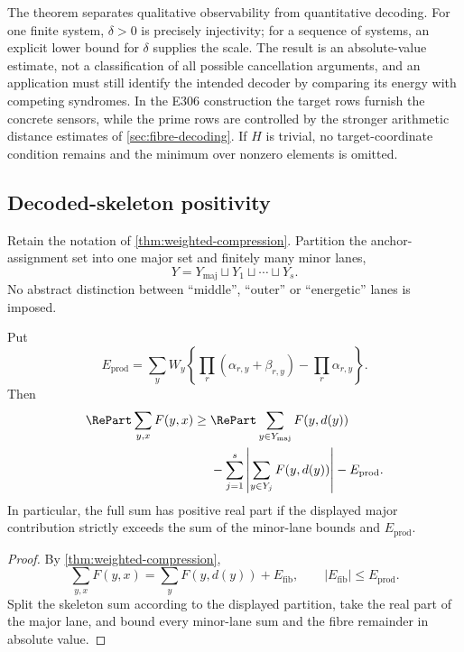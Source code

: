 The theorem separates qualitative observability from quantitative decoding.  For one finite system, $\delta>0$ is precisely injectivity; for a sequence of systems, an explicit lower bound for $\delta$ supplies the scale.  The result is an absolute-value estimate, not a classification of all possible cancellation arguments, and an application must still identify the intended decoder by comparing its energy with competing syndromes.  In the E306 construction the target rows furnish the concrete sensors, while the prime rows are controlled by the stronger arithmetic distance estimates of \cref{sec:fibre-decoding}.  If $H$ is trivial, no target-coordinate condition remains and the minimum over nonzero elements is omitted.

\subsection{Decoded-skeleton positivity}

Retain the notation of \cref{thm:weighted-compression}.  Partition the anchor-assignment set into one major set and finitely many minor lanes,
\[
 Y=Y_{\mathrm{maj}}\sqcup Y_1\sqcup\cdots\sqcup Y_s.
\]
No abstract distinction between ``middle'', ``outer'' or ``energetic'' lanes is imposed.

\begin{proposition}
\label{prop:decoded-skeleton-positivity}
Put
\[
 E_{\mathrm{prod}}=
 \sum_yW_y\left\{
   \prod_r(\alpha_{r,y}+\beta_{r,y})
   -\prod_r\alpha_{r,y}
 \right\}.
\]
Then
\begin{align*}
 \RePart\sum_{y,x}F(y,x)
 \geq{}&
 \RePart\sum_{y\in Y_{\mathrm{maj}}}F(y,d(y))\\
 &-\sum_{j=1}^s\left|\sum_{y\in Y_j}F(y,d(y))\right|
 -E_{\mathrm{prod}}.
\end{align*}
In particular, the full sum has positive real part if the displayed major contribution strictly exceeds the sum of the minor-lane bounds and $E_{\mathrm{prod}}$.
\end{proposition}

\begin{proof}
By \cref{thm:weighted-compression},
\[
 \sum_{y,x}F(y,x)=\sum_yF(y,d(y))+E_{\mathrm{fib}},
 \qquad
 |E_{\mathrm{fib}}|\leq E_{\mathrm{prod}}.
\]
Split the skeleton sum according to the displayed partition, take the real part of the major lane, and bound every minor-lane sum and the fibre remainder in absolute value.
\end{proof}

